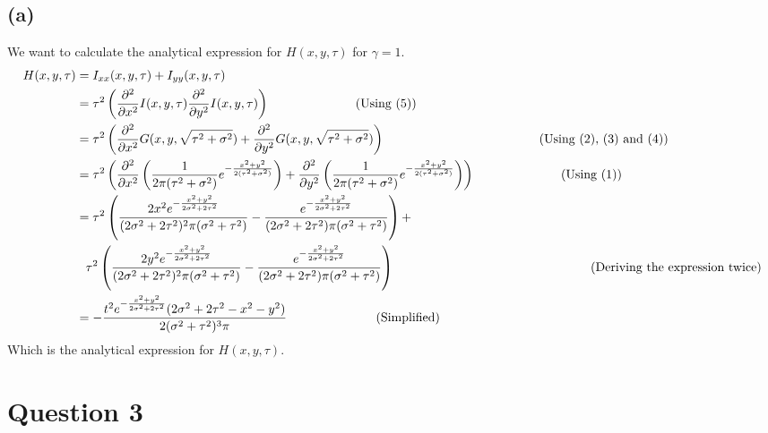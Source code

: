\documentclass[a4paper]{article}
\newcommand{\comment}[1]{%
  \text{\phantom{(#1)}} \tag{#1}}
\newcommand{\pd}[2]{%
  \frac{\partial^{#2}}{\partial #1^{#2}}}
\begin{document}
\subsection{(a)}
We want to calculate the analytical expression for $H(x,y,\tau)$ for $\gamma = 1$.
\begin{align*}
  H(x,y,\tau) &= I_{xx}(x,y,\tau) + I_{yy}(x,y,\tau)\\
  &= \tau^2 \left( \pd{x}{2} I(x,y,\tau) \pd{y}{2} I(x,y,\tau) \right) \comment{Using (5)}\\
  &= \tau^2 \left( \pd{x}{2} G(x,y,\sqrt{\tau^2 + \sigma^2}) + \pd{y}{2} G(x,y,\sqrt{\tau^2 + \sigma^2})\right) \comment{Using (2), (3) and (4)}\\
  &= \tau^2 \left( \pd{x}{2} \left(\frac{1}{2\pi(\tau^2 + \sigma^2)}e^{-\frac{x^2 + y^2}{2(\tau^2 + \sigma^2)}}\right) + \pd{y}{2} \left(\frac{1}{2\pi(\tau^2 + \sigma^2)}e^{-\frac{x^2 + y^2}{2(\tau^2 + \sigma^2)}}\right) \right) \comment{Using (1)}\\
  &= \tau^2 \left(\frac{2x^2e^{- \frac{x^2+y^2}{2\sigma^2 +2\tau^2}}}{(2\sigma^2 + 2\tau^2)^2\pi(\sigma^2 + \tau^2)}- \frac{e^{- \frac{x^2+y^2}{2\sigma^2 +2\tau^2}}}{(2\sigma^2 + 2\tau^2)\pi(\sigma^2 + \tau^2)}\right) + \\
  &\phantom{=} \tau^2\left(\frac{2y^2e^{- \frac{x^2+y^2}{2\sigma^2 +2\tau^2}}}{(2\sigma^2 + 2\tau^2)^2\pi(\sigma^2 + \tau^2)}- \frac{e^{- \frac{x^2+y^2}{2\sigma^2 +2\tau^2}}}{(2\sigma^2 + 2\tau^2)\pi(\sigma^2 + \tau^2)}\right) \comment{Deriving the expression twice}\\
  &= - \frac{t^2 e^{-\frac{x^2 + y^2}{2\sigma^2 + 2\tau^2}}(2\sigma^2 + 2 \tau^2 - x^2 - y^2)}{2(\sigma^2 + \tau^2)^3 \pi} \comment{Simplified}
\end{align*}
Which is the analytical expression for $H(x,y,\tau)$.

\section*{Question 3}
\end{document}
